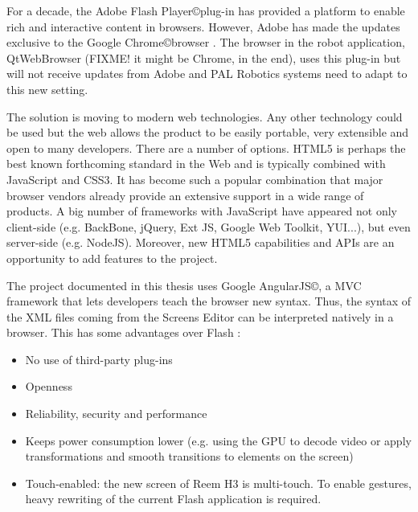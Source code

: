 For a decade, the Adobe Flash Player\copyright plug-in has provided a platform to enable rich and interactive content in browsers.
However, Adobe has made the updates exclusive to the Google Chrome\copyright browser \cite{FlashRoadmap}. 
The browser in the robot application, QtWebBrowser (FIXME! it might be Chrome, in the end), uses this plug-in but will not receive updates from Adobe and PAL Robotics systems need to adapt to this new setting. 

The solution is moving to modern web technologies.
Any other technology could be used but the web allows the product to be easily portable, very extensible and open to many developers.
There are a number of options. \ac{HTML5} is perhaps the best known forthcoming standard in the Web and is typically combined with JavaScript and \ac{CSS3}. 
It has become such a popular combination that major browser vendors already provide an extensive support in a wide range of products.
A big number of frameworks with JavaScript have appeared not only client-side (e.g. BackBone, jQuery, Ext JS, Google Web Toolkit, YUI...), but even server-side (e.g. NodeJS).
Moreover, new HTML5 capabilities and APIs are an opportunity to add features to the project.

The project documented in this thesis uses Google AngularJS\copyright, a \ac{MVC} framework that lets developers teach the browser new syntax. 
Thus, the syntax of the \ac{XML} files coming from the Screens Editor can be interpreted natively in a browser. 
This has some advantages over Flash \cite{Jobs:ThoughtsOnFlash}:
\begin{itemize}
    \item No use of third-party plug-ins
    \item Openness
    \item Reliability, security and performance
    \item Keeps power consumption lower (e.g. using the GPU to decode video or apply transformations and smooth transitions to elements on the screen)
    \item Touch-enabled: the new screen of Reem H3 is multi-touch. To enable gestures, heavy rewriting of the current Flash application is required.
\end{itemize}


